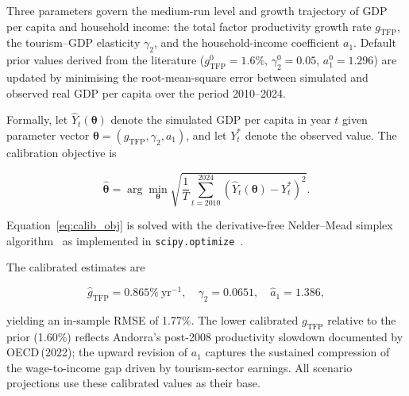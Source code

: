 \documentclass[urbansci,article,submit,pdftex,moreauthors]{Definitions/mdpi}
\begin{document}
Three parameters govern the medium-run level and growth trajectory of GDP per
capita and household income: the total factor productivity growth rate
$g_\text{TFP}$, the tourism--GDP elasticity $\gamma_2$, and the
household-income coefficient $a_1$. Default prior values derived from the
literature ($g_\text{TFP}^0=1.6\%$, $\gamma_2^0=0.05$, $a_1^0=1.296$) are
updated by minimising the root-mean-square error between simulated and observed
real GDP per capita over the period 2010--2024.

Formally, let $\hat{Y}_t(\boldsymbol{\theta})$ denote the simulated GDP per
capita in year $t$ given parameter vector
$\boldsymbol{\theta}=(g_\text{TFP},\gamma_2,a_1)$, and let $Y_t^*$ denote the
observed value. The calibration objective is

\begin{linenomath}
\begin{equation}
  \hat{\boldsymbol{\theta}} = \arg\min_{\boldsymbol{\theta}}
    \sqrt{\frac{1}{T}\sum_{t=2010}^{2024}
    \left(\hat{Y}_t(\boldsymbol{\theta}) - Y_t^*\right)^2}.
  \label{eq:calib_obj}
\end{equation}
\end{linenomath}

Equation~\eqref{eq:calib_obj} is solved with the derivative-free Nelder--Mead
simplex algorithm~\cite{Nelder1965} as implemented in
\texttt{scipy.optimize}~\cite{Virtanen2020}.

The calibrated estimates are

\begin{linenomath}
\begin{equation}
  \hat{g}_\text{TFP} = 0.865\%~\text{yr}^{-1}, \quad
  \hat{\gamma}_2 = 0.0651, \quad
  \hat{a}_1 = 1.386,
  \label{eq:calib_result}
\end{equation}
\end{linenomath}

yielding an in-sample RMSE of 1.77\%. The lower calibrated $g_\text{TFP}$
relative to the prior (1.60\%) reflects Andorra's post-2008 productivity
slowdown documented by OECD\,(2022); the upward revision of $a_1$ captures the
sustained compression of the wage-to-income gap driven by tourism-sector
earnings. All scenario projections use these calibrated values as their base.
\end{document}
